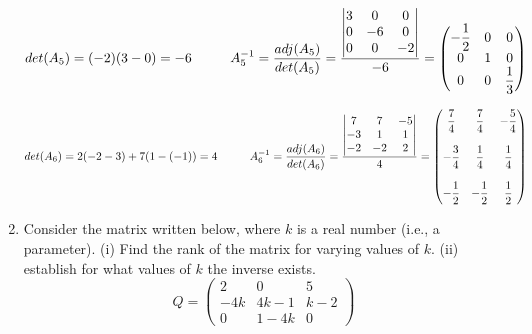 \documentclass[fleqn]{article}
\begin{document}
\begin{enumerate}
      \textcolor{hwColor}{
        $
        det(A_5)=(-2)(3-0)=-6
        \hskip 1truecm
        A_5^{-1}=\dfrac{adj(A_5)}{det(A_5)}=\dfrac{
          \begin{vmatrix}
           3 & 0 & 0 \\
           0 & -6 & 0 \\
           0 & 0 & -2 \\
          \end{vmatrix}
        }{-6}=\begin{pmatrix}
          -\dfrac{1}{2}& 0 & 0 \\
          0 & 1 & 0 \\
          0 & 0 & \dfrac{1}{3}\\
        \end{pmatrix}
        $
      }

      \textcolor{hwColor}{
        $
        det(A_6)=2(-2-3)+7(1-(-1))=4
        \hskip 1truecm
        A_6^{-1}=\dfrac{adj(A_6)}{det(A_6)}=\dfrac{
          \begin{vmatrix}
           7 & 7 & -5 \\
           -3 & 1 & 1 \\
           -2 & -2 & 2 \\
          \end{vmatrix}
        }{4}=\begin{pmatrix}
         \dfrac{7}{4} & \dfrac{7}{4} & -\dfrac{5}{4} \\
         \\
         -\dfrac{3}{4} & \dfrac{1}{4} & \dfrac{1}{4} \\
         \\
         -\dfrac{1}{2} & -\dfrac{1}{2} & \dfrac{1}{2} \\
        \end{pmatrix}
        $
      }

    
    \item  Consider the matrix written below, where $k$ is a real number (i.e., a parameter). (i) Find the rank of the matrix for varying values of $k$. (ii) establish for what values of $k$ the inverse exists. 
      $$
      Q = 
      \begin{pmatrix}
      2 & 0 & 5 \\
      -4k & 4k-1 & k-2 \\
      0 & 1-4k & 0
      \end{pmatrix}
      $$

  \end{enumerate}
\end{document}
